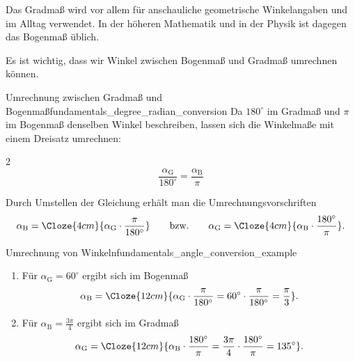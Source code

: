 Das Gradmaß wird vor allem für anschauliche geometrische Winkelangaben und im
Alltag verwendet. In der höheren Mathematik und in der Physik ist dagegen das
Bogenmaß üblich.

\clearpage
Es ist wichtig, dass wir Winkel zwischen Bogenmaß und Gradmaß umrechnen können.
\begin{KeyPointBox}{Umrechnung zwischen Gradmaß und Bogenmaß}{fundamentals_degree_radian_conversion}
  Da $180^\circ$ im Gradmaß und $\pi$ im Bogenmaß denselben Winkel
  beschreiben, lassen sich die Winkelmaße mit einem Dreisatz umrechnen:
  \begin{ClozeArea}[8]{2}
    \[
      \frac{\alpha_{\mathrm G}}{180^\circ} =\frac{\alpha_{\mathrm B}}{\pi}
    \]
  \end{ClozeArea}
  Durch Umstellen der Gleichung erhält man die Umrechnungsvorschriften
  \[
    \alpha_{\mathrm B} = \Cloze{4cm}{\alpha_{\mathrm G}\cdot\frac{\pi}{180^\circ}}
    \qquad \text{bzw.} \qquad
    \alpha_{\mathrm G} =\Cloze{4cm}{\alpha_{\mathrm B}\cdot\frac{180^\circ}{\pi}}.
  \]
\end{KeyPointBox}

\begin{ExampleBox}{Umrechnung von Winkeln}{fundamentals_angle_conversion_example}
  \begin{enumerate}[label=\alph*)]
    \item Für $\alpha_{\mathrm G}=60^\circ$ ergibt sich im Bogenmaß
      \[
        \alpha_{\mathrm B} =
          \Cloze{12cm}{
          \alpha_{\mathrm G}\cdot\frac{\pi}{180^\circ}=60^\circ\cdot\frac{\pi}{180^\circ}=\frac{\pi}{3}
          }.
      \]
    \item Für $\alpha_{\mathrm B}=\frac{3\pi}{4}$ ergibt sich im Gradmaß
      \[
        \alpha_{\mathrm G} =
          \Cloze{12cm}{
          \alpha_{\mathrm B}\cdot\frac{180^\circ}{\pi} = \frac{3\pi}{4}\cdot\frac{180^\circ}{\pi} = 135^\circ
          }.
      \]
  \end{enumerate}
\end{ExampleBox}


